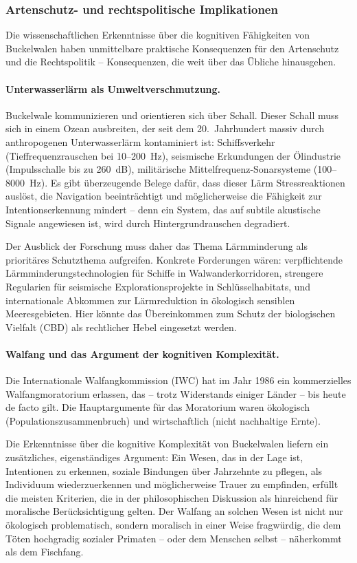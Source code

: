 ﻿\documentclass[12pt,a4paper]{article}
\theoremstyle{definition}
\theoremstyle{remark}
\begin{document}
\subsubsection{Artenschutz- und rechtspolitische Implikationen}

Die wissenschaftlichen Erkenntnisse über die kognitiven Fähigkeiten von Buckelwalen haben unmittelbare praktische Konsequenzen für den Artenschutz und die Rechtspolitik -- Konsequenzen, die weit über das Übliche hinausgehen.

\paragraph{Unterwasserlärm als Umweltverschmutzung.}
Buckelwale kommunizieren und orientieren sich über Schall. Dieser Schall muss sich in einem Ozean ausbreiten, der seit dem 20.\ Jahrhundert massiv durch anthropogenen Unterwasserlärm kontaminiert ist: Schiffsverkehr (Tieffrequenzrauschen bei 10--200~Hz), seismische Erkundungen der Ölindustrie (Impulsschalle bis zu 260~dB), militärische Mittelfrequenz-Sonarsysteme (100--8000~Hz). Es gibt überzeugende Belege dafür, dass dieser Lärm Stressreaktionen auslöst, die Navigation beeinträchtigt und möglicherweise die Fähigkeit zur Intentionserkennung mindert -- denn ein System, das auf subtile akustische Signale angewiesen ist, wird durch Hintergrundrauschen degradiert.

Der Ausblick der Forschung muss daher das Thema Lärmminderung als prioritäres Schutzthema aufgreifen. Konkrete Forderungen wären: verpflichtende Lärmminderungstechnologien für Schiffe in Walwanderkorridoren, strengere Regularien für seismische Explorationsprojekte in Schlüsselhabitats, und internationale Abkommen zur Lärmreduktion in ökologisch sensiblen Meeresgebieten. Hier könnte das Übereinkommen zum Schutz der biologischen Vielfalt (CBD) als rechtlicher Hebel eingesetzt werden.

\paragraph{Walfang und das Argument der kognitiven Komplexität.}
Die Internationale Walfangkommission (IWC) hat im Jahr 1986 ein kommerzielles Walfangmoratorium erlassen, das -- trotz Widerstands einiger Länder -- bis heute de facto gilt. Die Hauptargumente für das Moratorium waren ökologisch (Populationszusammenbruch) und wirtschaftlich (nicht nachhaltige Ernte).

Die Erkenntnisse über die kognitive Komplexität von Buckelwalen liefern ein zusätzliches, eigenständiges Argument: Ein Wesen, das in der Lage ist, Intentionen zu erkennen, soziale Bindungen über Jahrzehnte zu pflegen, als Individuum wiederzuerkennen und möglicherweise Trauer zu empfinden, erfüllt die meisten Kriterien, die in der philosophischen Diskussion als hinreichend für moralische Berücksichtigung gelten. Der Walfang an solchen Wesen ist nicht nur ökologisch problematisch, sondern moralisch in einer Weise fragwürdig, die dem Töten hochgradig sozialer Primaten -- oder dem Menschen selbst -- näherkommt als dem Fischfang.
\end{document}
